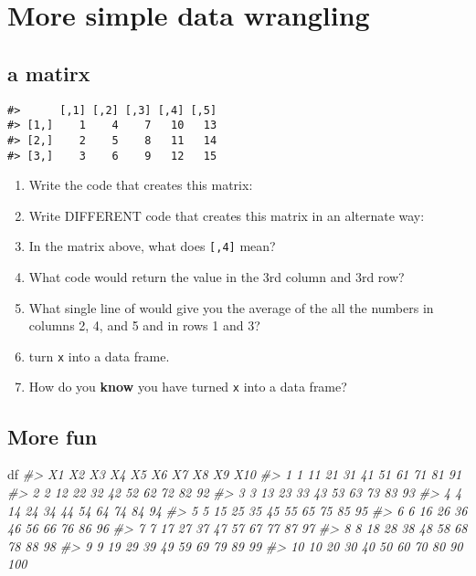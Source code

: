 \documentclass[
]{book}
\newenvironment{Shaded}{\begin{snugshade}}{\end{snugshade}}
\newcommand{\CommentTok}[1]{\textcolor[rgb]{0.56,0.35,0.01}{\textit{#1}}}
\newcommand{\NormalTok}[1]{#1}
\begin{document}
\hypertarget{more-simple-data-wrangling}{%
\chapter{More simple data wrangling}\label{more-simple-data-wrangling}}

\hypertarget{a-matirx}{%
\section{a matirx}\label{a-matirx}}

\begin{verbatim}
#>      [,1] [,2] [,3] [,4] [,5]
#> [1,]    1    4    7   10   13
#> [2,]    2    5    8   11   14
#> [3,]    3    6    9   12   15
\end{verbatim}

\begin{enumerate}
\def\labelenumi{\arabic{enumi}.}
\item
  Write the code that creates this matrix:
\item
  Write DIFFERENT code that creates this matrix in an alternate way:
\item
  In the matrix above, what does \texttt{{[},4{]}} mean?
\item
  What code would return the value in the 3rd column and 3rd row?
\item
  What single line of would give you the average of the all the numbers in columns 2, 4, and 5 and in rows 1 and 3?
\item
  turn \texttt{x} into a data frame.
\item
  How do you \textbf{know} you have turned \texttt{x} into a data frame?
\end{enumerate}

\hypertarget{more-fun}{%
\section{More fun}\label{more-fun}}

\begin{Shaded}
\begin{Highlighting}[]
\NormalTok{df}
\CommentTok{\#\textgreater{}    X1 X2 X3 X4 X5 X6 X7 X8 X9 X10}
\CommentTok{\#\textgreater{} 1   1 11 21 31 41 51 61 71 81  91}
\CommentTok{\#\textgreater{} 2   2 12 22 32 42 52 62 72 82  92}
\CommentTok{\#\textgreater{} 3   3 13 23 33 43 53 63 73 83  93}
\CommentTok{\#\textgreater{} 4   4 14 24 34 44 54 64 74 84  94}
\CommentTok{\#\textgreater{} 5   5 15 25 35 45 55 65 75 85  95}
\CommentTok{\#\textgreater{} 6   6 16 26 36 46 56 66 76 86  96}
\CommentTok{\#\textgreater{} 7   7 17 27 37 47 57 67 77 87  97}
\CommentTok{\#\textgreater{} 8   8 18 28 38 48 58 68 78 88  98}
\CommentTok{\#\textgreater{} 9   9 19 29 39 49 59 69 79 89  99}
\CommentTok{\#\textgreater{} 10 10 20 30 40 50 60 70 80 90 100}
\end{Highlighting}
\end{Shaded}
\end{document}
